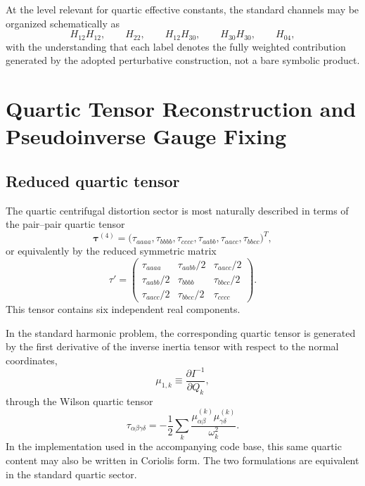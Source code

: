At the level relevant for quartic effective constants, the standard channels
may be organized schematically as
\begin{equation}
H_{12}H_{12},\qquad H_{22},\qquad H_{12}H_{30},\qquad H_{30}H_{30},\qquad H_{04},
\end{equation}
with the understanding that each label denotes the fully weighted contribution
generated by the adopted perturbative construction, not a bare symbolic
product.

\section{Quartic Tensor Reconstruction and Pseudoinverse Gauge Fixing}

\subsection{Reduced quartic tensor}

The quartic centrifugal distortion sector is most naturally described in terms
of the pair--pair quartic tensor
\begin{equation}
\boldsymbol\tau^{(4)} =
\bigl(
\tau_{aaaa},\tau_{bbbb},\tau_{cccc},
\tau_{aabb},\tau_{aacc},\tau_{bbcc}
\bigr)^T ,
\end{equation}
or equivalently by the reduced symmetric matrix
\begin{equation}
\tau'=
\begin{pmatrix}
\tau_{aaaa} & \tau_{aabb}/2 & \tau_{aacc}/2 \\
\tau_{aabb}/2 & \tau_{bbbb} & \tau_{bbcc}/2 \\
\tau_{aacc}/2 & \tau_{bbcc}/2 & \tau_{cccc}
\end{pmatrix}.
\end{equation}
This tensor contains six independent real components.

In the standard harmonic problem, the corresponding quartic tensor is generated
by the first derivative of the inverse inertia tensor with respect to the
normal coordinates,
\begin{equation}
\mu_{1,k} \equiv \frac{\partial I^{-1}}{\partial Q_k},
\end{equation}
through the Wilson quartic tensor
\begin{equation}
\tau_{\alpha\beta\gamma\delta}
=
-\frac12
\sum_k
\frac{
\mu_{\alpha\beta}^{(k)}
\mu_{\gamma\delta}^{(k)}
}{\omega_k^2}.
\label{eq:app_quartic_tau}
\end{equation}
In the implementation used in the accompanying code base, this same quartic
content may also be written in Coriolis form. The two formulations are
equivalent in the standard quartic sector.

